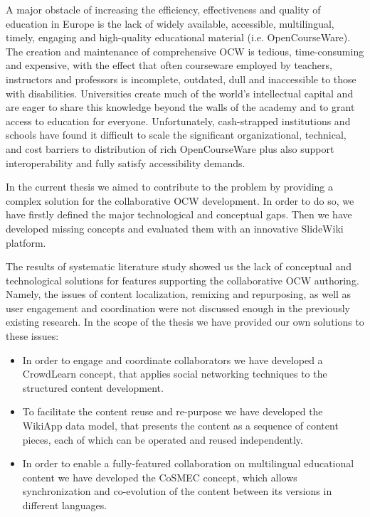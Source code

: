 \documentclass[ngerman,UKenglish,table]{scrbook}
\begin{document}
A major obstacle of increasing the efficiency, effectiveness and quality of education in Europe is the lack of widely available, accessible, multilingual, timely, engaging and high-quality educational material (i.e. OpenCourseWare).
The creation and maintenance of comprehensive OCW is tedious, time-consuming and expensive, with the effect that often courseware employed by teachers, instructors and professors is incomplete, outdated, dull and inaccessible to those with disabilities. 
Universities create much of the world’s intellectual capital and are eager to share this knowledge beyond the walls of the academy and to grant access to education for everyone.
Unfortunately, cash-strapped institutions and schools have found it difficult to scale the significant organizational, technical, and cost barriers to distribution of rich OpenCourseWare plus also support interoperability and fully satisfy accessibility demands.

In the current thesis we aimed to contribute to the problem by providing a complex solution for the collaborative OCW development.
In order to do so, we have firstly defined the major technological and conceptual gaps.
Then we have developed missing concepts and evaluated them with an innovative SlideWiki platform.

The results of systematic literature study showed us the lack of conceptual and technological solutions for features supporting the collaborative OCW authoring.
Namely, the issues of content localization, remixing and repurposing, as well as user engagement and coordination were not discussed enough in the previously existing research.
In the scope of the thesis we have provided our own solutions to these issues:
\begin{itemize}
\item In order to engage and coordinate collaborators we have developed a CrowdLearn concept, that applies social networking techniques to the structured content development.
\item To facilitate the content reuse and re-purpose we have developed the WikiApp data model, that presents the content as a sequence of content pieces, each of which can be operated and reused independently.
\item In order to enable a fully-featured collaboration on multilingual educational content we have developed the CoSMEC concept, which allows synchronization and co-evolution of the content between its versions in different languages.
\end{itemize}
\end{document}
